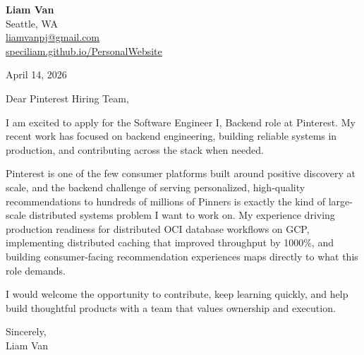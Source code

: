 \documentclass[letterpaper,11pt]{article}
\begin{document}
\begin{flushleft}
\textbf{\Large Liam Van} \\
Seattle, WA \\
\href{mailto:liamvanpj@gmail.com}{liamvanpj@gmail.com} \\
\href{https://speciliam.github.io/PersonalWebsite}{speciliam.github.io/PersonalWebsite}
\end{flushleft}

April 14, 2026

\noindent Dear Pinterest Hiring Team,

\noindent I am excited to apply for the Software Engineer I, Backend role at Pinterest. My recent work has focused on backend engineering, building reliable systems in production, and contributing across the stack when needed.

\noindent Pinterest is one of the few consumer platforms built around positive discovery at scale, and the backend challenge of serving personalized, high-quality recommendations to hundreds of millions of Pinners is exactly the kind of large-scale distributed systems problem I want to work on. My experience driving production readiness for distributed OCI database workflows on GCP, implementing distributed caching that improved throughput by 1000\%, and building consumer-facing recommendation experiences maps directly to what this role demands.

\noindent I would welcome the opportunity to contribute, keep learning quickly, and help build thoughtful products with a team that values ownership and execution.

\noindent Sincerely, \\
Liam Van
\end{document}
